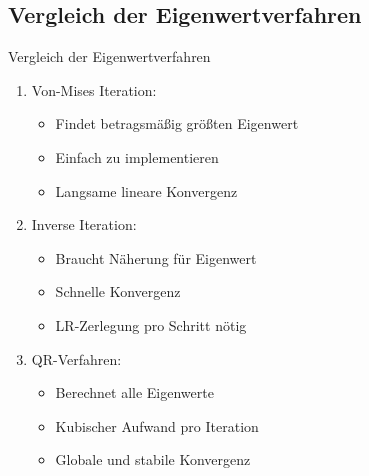 \pagebreak
\raggedcolumns

\subsection{Vergleich der Eigenwertverfahren}

\begin{concept}{Vergleich der Eigenwertverfahren}
\begin{enumerate}
    \item Von-Mises Iteration:
    \begin{itemize}
        \item Findet betragsmäßig größten Eigenwert
        \item Einfach zu implementieren
        \item Langsame lineare Konvergenz
    \end{itemize}
    
    \item Inverse Iteration:
    \begin{itemize}
        \item Braucht Näherung für Eigenwert
        \item Schnelle Konvergenz
        \item LR-Zerlegung pro Schritt nötig
    \end{itemize}
    
    \item QR-Verfahren:
    \begin{itemize}
        \item Berechnet alle Eigenwerte 
        \item Kubischer Aufwand pro Iteration
        \item Globale und stabile Konvergenz
    \end{itemize}
\end{enumerate}
\end{concept}

